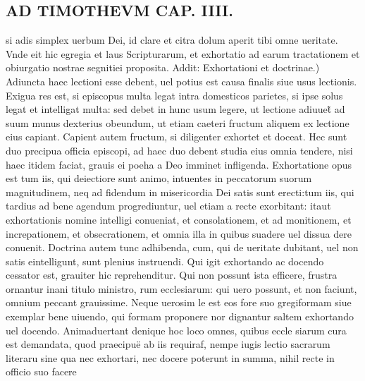 \documentclass{article}
\begin{document}
\begin{pages}
\section*{AD TIMOTHEVM CAP. IIII. }
\marginpar{[ p.101 ]}\pstart si adis simplex uerbum Dei, id clare et citra dolum aperit tibi omne ueritate. Vnde eit hic egregia et laus Scripturarum, et exhortatio ad earum tractationem et obiurgatio nostrae segnitiei proposita. Addit:  \pend\pstart Exhortationi et doctrinae.) Adiuncta haec lectioni esse debent, uel potius est causa finalis siue usus lectionis. Exigua res est, si episcopus multa legat intra domesticos parietes, si ipse solus legat et intelligat multa: sed debet in hunc usum legere, ut lectione adiuuet̃ ad suum munus dexterius obeundum, ut etiam caeteri fructum aliquem ex lectione eius capiant. Capient autem fructum, si diligenter exhortet et doceat. Hec sunt duo precipua officia episcopi, ad haec duo debent studia eius omnia tendere, nisi haec itidem faciat, grauis ei poeha a Deo imminet infligenda. Exhortatione opus est tum iis, qui deiectiore sunt animo, intuentes in peccatorum suorum magnitudinem, neq ad fidendum in misericordia Dei satis sunt erecti:tum iis, qui tardius ad bene agendum progrediuntur, uel etiam a recte exorbitant: itaut exhortationis nomine intelligi conueniat, et consolationem, et ad monitionem, et increpationem, et obsecrationem, et omnia illa in quibus suadere uel dissua dere conuenit. Doctrina autem tunc adhibenda, cum, qui de ueritate dubitant, uel non satis eintelligunt, sunt plenius instruendi. Qui igit exhortando ac docendo cessator est, grauiter hic reprehenditur. Qui non possunt ista efficere, frustra ornantur inani titulo ministro, rum ecclesiarum: qui uero possunt, et non faciunt, omnium peccant grauissime. Neque uerosim le est eos fore suo gregiformam siue exemplar bene uiuendo, qui formam proponere nor dignantur saltem exhortando uel docendo. Animaduertant denique hoc loco omnes, quibus eccle siarum cura est demandata, quod praecipuë ab iis requiraf, nempe iugis lectio sacrarum literaru sine qua nec exhortari, nec docere poterunt in summa, nihil recte in officio suo facere  \pend
{}
{}

\end{pages}
\end{document}
